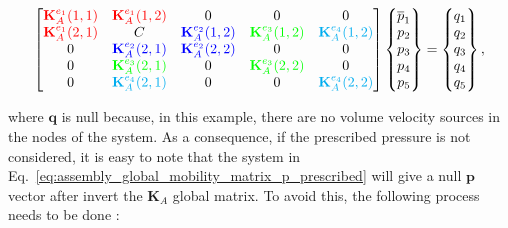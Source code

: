 \documentclass[12pt]{article}
\begin{document}
\begin{equation} \label{eq:assembly_global_mobility_matrix_p_prescribed}
	\begin{bmatrix}
		\textcolor{red}{\mathbf{K}_{A}^{e_1}(1,1)} & \textcolor{red}{\mathbf{K}_{A}^{e_1}(1,2)} & 0 & 0 & 0 \\
		\textcolor{red}{\mathbf{K}_{A}^{e_1}(2,1)}  & C & \textcolor{blue}{\mathbf{K}_{A}^{e_2}(1,2)} & \textcolor{green}{\mathbf{K}_{A}^{e_3}(1,2)} & \textcolor{cyan}{\mathbf{K}_{A}^{e_4}(1,2)} \\
		0   &   \textcolor{blue}{\mathbf{K}_{A}^{e_2}(2,1)}   &   \textcolor{blue}{\mathbf{K}_{A}^{e_2}(2,2)}   & 0 & 0 \\
		0   &   \textcolor{green}{\mathbf{K}_{A}^{e_3}(2,1)}   &   0   &  \textcolor{green}{\mathbf{K}_{A}^{e_3}(2,2)}  &   0 \\
		0   &   \textcolor{cyan}{\mathbf{K}_{A}^{e_4}(2,1)}   &   0   &   0   &   \textcolor{cyan}{\mathbf{K}_{A}^{e_4}(2,2)}
	\end{bmatrix}
	\begin{Bmatrix}
		\overline{p}_1 \\
		p_2 \\
		p_3 \\
		p_4 \\
		p_5 \\
	\end{Bmatrix}
	=
	\begin{Bmatrix}
		q_1 \\
		q_2 \\
		q_3 \\
		q_4 \\
		q_5 \\
	\end{Bmatrix},
\end{equation}

\noindent where $\mathbf{q}$ is null because, in this example, there are no volume velocity sources in the nodes of the system. As a consequence, if the prescribed pressure is not considered, it is easy to note that the system in Eq.~\ref{eq:assembly_global_mobility_matrix_p_prescribed} will give a null $\mathbf{p}$ vector after invert the $\mathbf{K}_{A}$ global matrix. To avoid this, the following process needs to be done \cite{fancello}:
\end{document}
